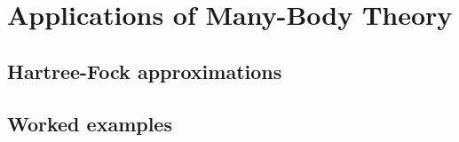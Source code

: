 \documentclass[../QFT_main.tex]{subfiles}
\begin{document}
\chapter{Applications of Many-Body Theory}\label{ch:applications_many_body_theory}


\section{Hartree-Fock approximations}



\section{Worked examples}
\end{document}
